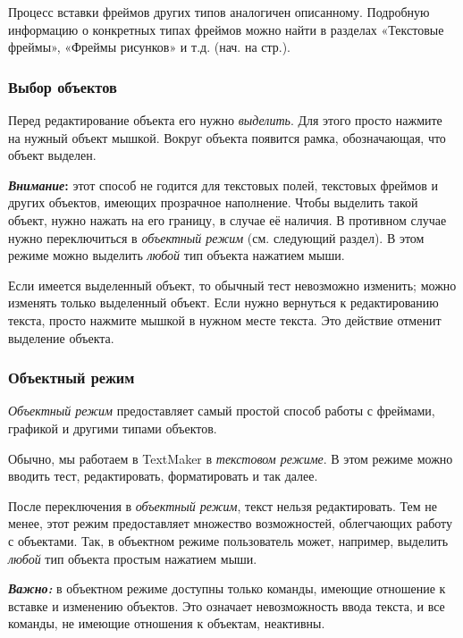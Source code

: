 ﻿\documentclass[a4paper,10pt]{article}
\begin{document}
Процесс вставки фреймов других типов аналогичен описанному. Подробную информацию о конкретных типах фреймов можно найти в разделах «Текстовые фреймы», «Фреймы рисунков» и т.д. (нач. на стр.).

\subsubsection{Выбор объектов}
Перед редактирование объекта его нужно \textit{выделить}. Для этого просто нажмите на нужный объект мышкой. Вокруг объекта появится рамка, обозначающая, что объект выделен.

\begin{mdframed}[backgroundcolor=blue!10]
\textbf{\textit{Внимание}:} этот способ не годится для текстовых полей, текстовых фреймов и других объектов, имеющих прозрачное наполнение. Чтобы выделить такой объект, нужно нажать на его границу, в случае её наличия.  В противном случае нужно переключиться в \textit{объектный режим} (см. следующий раздел). В этом режиме можно выделить \textit{любой} тип объекта нажатием мыши.
\end{mdframed}

Если имеется выделенный объект, то обычный тест невозможно изменить; можно изменять только выделенный объект. Если нужно вернуться к редактированию текста, просто нажмите мышкой в нужном месте текста. Это действие отменит выделение объекта.

\subsubsection{Объектный режим}
\textit{Объектный режим} предоставляет самый простой способ работы с фреймами, графикой и другими типами объектов.

Обычно, мы работаем в TextMaker в \textit{текстовом режиме}. В этом режиме можно вводить тест, редактировать, форматировать и так далее.

После переключения в \textit{объектный режим}, текст нельзя редактировать. Тем не менее, этот режим предоставляет множество возможностей, облегчающих работу с объектами. Так, в объектном режиме пользователь может, например, выделить \textit{любой} тип объекта простым нажатием мыши.

\begin{mdframed}[backgroundcolor=blue!10]
\textbf{\textit{Важно:}} в объектном режиме доступны только команды, имеющие отношение к вставке и изменению объектов. Это означает невозможность ввода текста, и все команды, не имеющие отношения к объектам, неактивны.
\end{mdframed}
\end{document}
